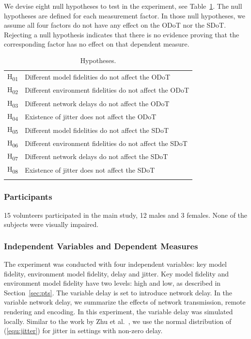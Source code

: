 We devise eight null hypotheses to test in the experiment, see Table~\ref{tab:hypo}. The null hypotheses are defined for each measurement factor. In those null hypotheses, we assume all four factors do not have any effect on the ODoT nor the SDoT. Rejecting a null hypothesis indicates that there is no evidence proving that the corresponding factor has no effect on that dependent measure.

\begin{table}[!htbp]
\caption{Hypotheses.}
\label{tab:hypo}
\begin{tabular}{ll}
\noalign{\smallskip}\hline\noalign{\smallskip}
H\textsubscript{01} & Different model fidelities do not affect the ODoT \\
H\textsubscript{02} & Different environment fidelities do not affect the ODoT \\
H\textsubscript{03} & Different network delays do not affect the ODoT \\
H\textsubscript{04} & Existence of jitter does not affect the ODoT \\
H\textsubscript{05} & Different model fidelities do not affect the SDoT \\
H\textsubscript{06} & Different environment fidelities do not affect the SDoT \\
H\textsubscript{07} & Different network delays do not affect the SDoT \\
H\textsubscript{08} & Existence of jitter does not affect the SDoT \\
\noalign{\smallskip}\hline
\end{tabular}
\end{table}

\subsubsection{Participants}

15 volunteers participated in the main study, 12 males and 3 females. None of the subjects were visually impaired.

\subsubsection{Independent Variables and Dependent Measures}
\label{sec:ms:ivdm}

The experiment was conducted with four independent variables: key model fidelity, environment model fidelity, delay and jitter.
Key model fidelity and environment model fidelity have two levels: high and low, as described in Section~\ref{sec:pts}.
The variable delay is set to introduce network delay. In the variable network delay, we summarize the effects of network transmission, remote rendering and encoding. In this experiment, the variable delay was simulated locally. Similar to the work by Zhu et al.~\cite{zhu1998jitter}, we use the normal distribution of (\ref{equ:jitter}) for jitter in settings with non-zero delay.

